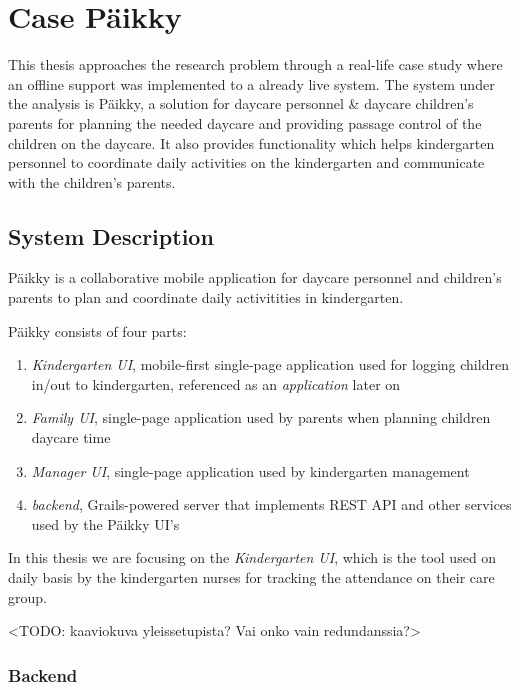 
\chapter{Case Päikky}
This thesis approaches the research problem through a real-life case study where an offline support was implemented to a already live system. The system under the analysis is Päikky, a solution for daycare personnel & daycare children’s parents for planning the needed daycare and providing passage control of the children on the daycare. It also provides functionality which helps kindergarten personnel to coordinate daily activities on the kindergarten and communicate with the children's parents.


\section{System Description}


Päikky is a collaborative mobile application for daycare personnel and children's parents to plan and coordinate daily activitities in kindergarten. 

Päikky consists of four parts:

\begin{enumerate}
	\item \textit{Kindergarten UI}, mobile-first single-page application used for logging children in/out to kindergarten, referenced as an \textit{application} later on
	\item \textit{Family UI}, single-page application used by parents when planning children daycare time
	\item \textit{Manager UI}, single-page application used by kindergarten management 
	\item \textit{backend}, Grails-powered server that implements REST API and other services used by the Päikky UI's 
\end{enumerate}

\noindent In this thesis we are focusing on the \textit{Kindergarten UI}, which is the tool used on daily basis by the kindergarten nurses for tracking the attendance on their care group. 

<TODO: kaaviokuva yleissetupista? Vai onko vain redundanssia?>

\subsection{Backend}

